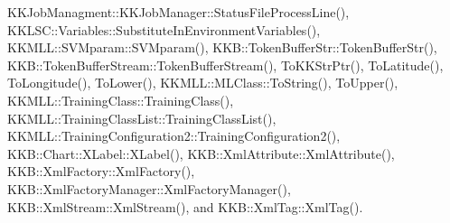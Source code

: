 K\+K\+Job\+Managment\+::\+K\+K\+Job\+Manager\+::\+Status\+File\+Process\+Line(), K\+K\+L\+S\+C\+::\+Variables\+::\+Substitute\+In\+Environment\+Variables(), K\+K\+M\+L\+L\+::\+S\+V\+Mparam\+::\+S\+V\+Mparam(), K\+K\+B\+::\+Token\+Buffer\+Str\+::\+Token\+Buffer\+Str(), K\+K\+B\+::\+Token\+Buffer\+Stream\+::\+Token\+Buffer\+Stream(), To\+K\+K\+Str\+Ptr(), To\+Latitude(), To\+Longitude(), To\+Lower(), K\+K\+M\+L\+L\+::\+M\+L\+Class\+::\+To\+String(), To\+Upper(), K\+K\+M\+L\+L\+::\+Training\+Class\+::\+Training\+Class(), K\+K\+M\+L\+L\+::\+Training\+Class\+List\+::\+Training\+Class\+List(), K\+K\+M\+L\+L\+::\+Training\+Configuration2\+::\+Training\+Configuration2(), K\+K\+B\+::\+Chart\+::\+X\+Label\+::\+X\+Label(), K\+K\+B\+::\+Xml\+Attribute\+::\+Xml\+Attribute(), K\+K\+B\+::\+Xml\+Factory\+::\+Xml\+Factory(), K\+K\+B\+::\+Xml\+Factory\+Manager\+::\+Xml\+Factory\+Manager(), K\+K\+B\+::\+Xml\+Stream\+::\+Xml\+Stream(), and K\+K\+B\+::\+Xml\+Tag\+::\+Xml\+Tag().


